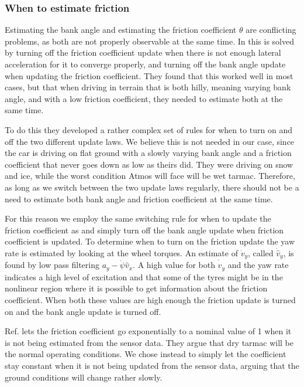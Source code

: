 \subsubsection{When to estimate friction}

Estimating the bank angle and estimating the friction coefficient $\theta$ are conflicting problems, as both are not properly observable at the same time. In \cite{MainStateEst} this is solved by turning off the friction coefficient update when there is not enough lateral acceleration for it to converge properly, and turning off the bank angle update when updating the friction coefficient. They found that this worked well in most cases, but that when driving in terrain that is both hilly, meaning varying bank angle, and with a low friction coefficient, they needed to estimate both at the same time. 

To do this they developed a rather complex set of rules for when to turn on and off the two different update laws. We believe this is not needed in our case, since the car is driving on flat ground with a slowly varying bank angle and a friction coefficient that never goes down as low as theirs did. They were driving on snow and ice, while the worst condition Atmos will face will be wet tarmac. Therefore, as long as we switch between the two update laws regularly, there should not be a need to estimate both bank angle and friction coefficient at the same time. 

For this reason we employ the same switching rule for when to update the friction coefficient as \cite{MainStateEst} and simply turn off the bank angle update when friction coefficient is updated. To determine when to turn on the friction update the yaw rate is estimated by looking at the wheel torques. An estimate of $\dot{v}_y$, called $\dot{\hat{v}}_y$, is found by low pass filtering $a_y - \dot{\psi}\hat{v}_x$. A high value for both $\dot{\hat{v}}_y$ and the yaw rate indicates a high level of excitation and that some of the tyres might be in the nonlinear region where it is possible to get information about the friction coefficient. When both these values are high enough the friction update is turned on and the bank angle update is turned off. 

Ref. \cite{MainStateEst} lets the friction coefficient go exponentially to a nominal value of 1 when it is not being estimated from the sensor data. They argue that dry tarmac will be the normal operating conditions. We chose instead to simply let the coefficient stay constant when it is not being updated from the sensor data, arguing that the ground conditions will change rather slowly.

